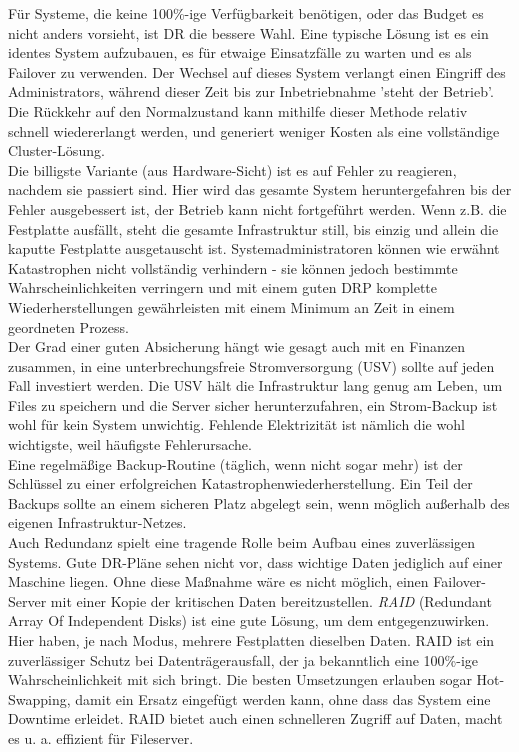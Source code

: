 \documentclass[letterpaper, 12pt]{article}
\begin{document}
Für Systeme, die keine 100\%-ige Verfügbarkeit benötigen, oder das Budget es nicht anders vorsieht, ist DR die bessere Wahl. Eine typische Lösung ist es ein identes System aufzubauen, es für etwaige Einsatzfälle zu warten und es als Failover zu verwenden. Der Wechsel auf dieses System verlangt einen Eingriff des Administrators, während dieser Zeit bis zur Inbetriebnahme 'steht der Betrieb'. Die Rückkehr auf den Normalzustand kann mithilfe dieser Methode relativ schnell wiedererlangt werden, und generiert weniger Kosten als eine vollständige Cluster-Lösung. \\
Die billigste Variante (aus Hardware-Sicht) ist es auf Fehler zu reagieren, nachdem sie passiert sind. Hier wird das gesamte System heruntergefahren bis der Fehler ausgebessert ist, der Betrieb kann nicht fortgeführt werden. Wenn z.B. die Festplatte ausfällt, steht die gesamte Infrastruktur still, bis einzig und allein die kaputte Festplatte ausgetauscht ist. Systemadministratoren können wie erwähnt Katastrophen nicht vollständig verhindern - sie können jedoch bestimmte Wahrscheinlichkeiten verringern und mit einem guten DRP komplette Wiederherstellungen gewährleisten mit einem Minimum an Zeit in einem geordneten Prozess. \\
Der Grad einer guten Absicherung hängt wie gesagt auch mit en Finanzen zusammen, in eine unterbrechungsfreie Stromversorgung (USV) sollte auf jeden Fall investiert werden. Die USV hält die Infrastruktur lang genug am Leben, um Files zu speichern und die Server sicher herunterzufahren, ein Strom-Backup ist wohl für kein System unwichtig. Fehlende Elektrizität ist nämlich die wohl wichtigste, weil häufigste Fehlerursache. \\
Eine regelmäßige Backup-Routine (täglich, wenn nicht sogar mehr) ist der Schlüssel zu einer erfolgreichen Katastrophenwiederherstellung. Ein Teil der Backups sollte an einem sicheren Platz abgelegt sein, wenn möglich außerhalb des eigenen Infrastruktur-Netzes. \\
Auch Redundanz spielt eine tragende Rolle beim Aufbau eines zuverlässigen Systems. Gute DR-Pläne sehen nicht vor, dass wichtige Daten jediglich auf einer Maschine liegen. Ohne diese Maßnahme wäre es nicht möglich, einen Failover-Server mit einer Kopie der kritischen Daten bereitzustellen. \textit{RAID} (Redundant Array Of Independent Disks) ist eine gute Lösung, um dem entgegenzuwirken. Hier haben, je nach Modus, mehrere Festplatten dieselben Daten. RAID ist ein zuverlässiger Schutz bei Datenträgerausfall, der ja bekanntlich eine 100\%-ige Wahrscheinlichkeit mit sich bringt. Die besten Umsetzungen erlauben sogar Hot-Swapping, damit ein Ersatz eingefügt werden kann, ohne dass das System eine Downtime erleidet. RAID bietet auch einen schnelleren Zugriff auf Daten, macht es u. a. effizient für Fileserver. 
\end{document}

